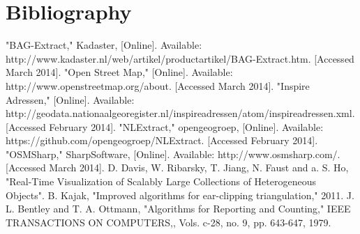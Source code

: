 \chapter{Bibliography}
\label{chap:Bibliography}
\begingroup
\renewcommand{\chapter}[2]{}%
\begin{thebibliography}{}
"BAG-Extract," Kadaster, [Online]. Available: http://www.kadaster.nl/web/artikel/productartikel/BAG-Extract.htm. [Accessed March 2014].
"Open Street Map," [Online]. Available: http://www.openstreetmap.org/about. [Accessed March 2014].
"Inspire Adressen," [Online]. Available: http://geodata.nationaalgeoregister.nl/inspireadressen/atom{\slash}inspireadressen.xml. [Accessed February 2014].
"NLExtract," opengeogroep, [Online]. Available: https://github.com/opengeogroep/NLExtract. [Accessed February 2014].
"OSMSharp," SharpSoftware, [Online]. Available: http://www.osmsharp.com/. [Accessed March 2014].
D. Davis, W. Ribarsky, T. Jiang, N. Faust and a. S. Ho, "Real-Time Visualization of Scalably Large Collections of Heterogeneous Objects".
B. Kajak, "Improved algorithms for ear-clipping triangulation," 2011.
J. L. Bentley and T. A. Ottmann, "Algorithms for Reporting and Counting," IEEE TRANSACTIONS ON COMPUTERS,, Vols. c-28, no. 9, pp. 643-647, 1979.
\end{thebibliography}
\endgroup
